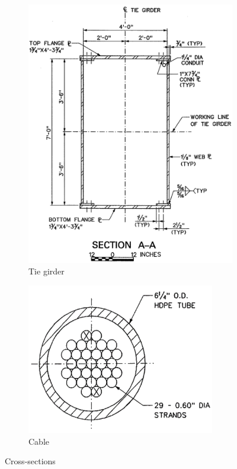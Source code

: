\begin{figure}[H]
\begin{subfigure}{.33\textwidth}
    \includegraphics[width=\textwidth]{overleaf/Appendix/Pictures/tie_3.PNG}
    \caption{Tie girder}
    \label{fig:cs_tie}
\end{subfigure}%
\begin{subfigure}{.33\textwidth}
    \centering
    \vspace*{1.35cm}
    \includegraphics[width=0.9\textwidth]{overleaf/Appendix/Pictures/cable_3.PNG}
    \vspace*{1.35cm}
    \caption{Cable}
    \label{fig:cs_cable}
\end{subfigure}\caption{Cross-sections}
\label{fig:cross_sections}
\end{figure}

